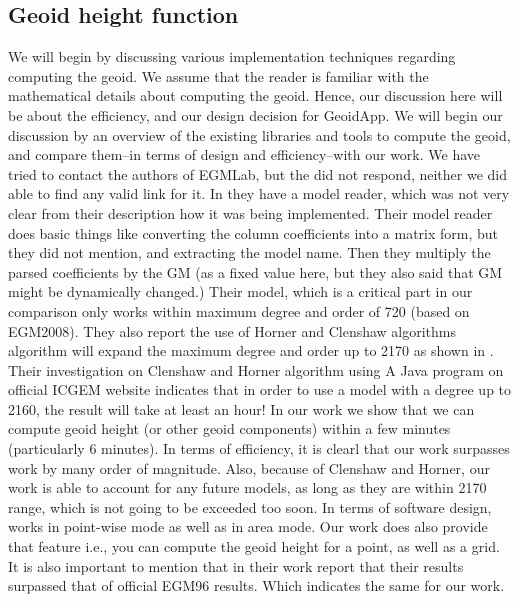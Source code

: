  

\subsection{Geoid height function}

We will begin by discussing various implementation techniques regarding computing the geoid. We assume that the reader is familiar with the mathematical details about computing the geoid. Hence, our discussion here will be about the efficiency, and our design decision for GeoidApp. We will begin our discussion by an overview of the existing libraries and tools to compute the geoid, and compare them--in terms of design and efficiency--with our work. We have tried to contact the authors of EGMLab, but the did not respond, neither we did able to find any valid link for it. In \cite{egmlab} they have a model reader, which was not very clear from their description how it was being implemented. Their model reader does basic things like converting the column coefficients into a matrix form, but they did not mention, and extracting the model name. Then they multiply the parsed coefficients by the GM (as a fixed value here, but they also said that GM might be dynamically changed.) Their model, which is a critical part in our comparison only works within maximum degree and order of 720 (based on EGM2008). They also report the use of Horner and Clenshaw algorithms algorithm will expand the maximum degree and order up to 2170 as shown in \cite{holmes}. Their investigation on Clenshaw and Horner algorithm using A Java program on official ICGEM website indicates that in order to use a model with a degree up to 2160, the result will take at least an hour! In our work we show that we can compute geoid height (or other geoid components) within a few minutes (particularly 6 minutes). In terms of efficiency, it is clearl that our work surpasses \cite{egmlab} work by many order of magnitude. Also, because of Clenshaw and Horner, our work is able to account for any future models, as long as they are within 2170 range, which is not going to be exceeded too soon. In terms of software design, \cite{egmlab} works in point-wise mode as well as in area mode. Our work does also provide that feature i.e., you can compute the geoid height for a point, as well as a grid. It is also important to mention that \cite{egmlab} in their work report that their results surpassed that of official EGM96 results. Which indicates the same for our work.
\\
